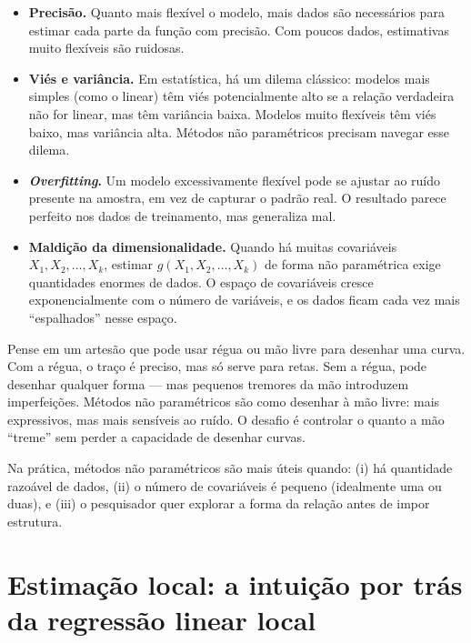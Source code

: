 \begin{itemize}
  \item \textbf{Precisão.} Quanto mais flexível o modelo, mais dados são necessários
  para estimar cada parte da função com precisão. Com poucos dados, estimativas muito
  flexíveis são ruidosas.

  \item \textbf{Viés e variância.} Em estatística, há um dilema clássico: modelos
  mais simples (como o linear) têm viés potencialmente alto se a relação verdadeira
  não for linear, mas têm variância baixa. Modelos muito flexíveis têm viés baixo,
  mas variância alta. Métodos não paramétricos precisam navegar esse dilema.

  \item \textbf{\emph{Overfitting}.} Um modelo excessivamente flexível pode se ajustar
  ao ruído presente na amostra, em vez de capturar o padrão real. O resultado parece
  perfeito nos dados de treinamento, mas generaliza mal.

  \item \textbf{Maldição da dimensionalidade.} Quando há muitas covariáveis $X_1, X_2,
  \ldots, X_k$, estimar $g(X_1, X_2, \ldots, X_k)$ de forma não paramétrica exige
  quantidades enormes de dados. O espaço de covariáveis cresce exponencialmente com
  o número de variáveis, e os dados ficam cada vez mais ``espalhados'' nesse espaço.
\end{itemize}

\begin{destacebox}
Pense em um artesão que pode usar régua ou mão livre para desenhar uma curva. Com a
régua, o traço é preciso, mas só serve para retas. Sem a régua, pode desenhar qualquer
forma — mas pequenos tremores da mão introduzem imperfeições. Métodos não paramétricos
são como desenhar à mão livre: mais expressivos, mas mais sensíveis ao ruído. O
desafio é controlar o quanto a mão ``treme'' sem perder a capacidade de desenhar
curvas.
\end{destacebox}

Na prática, métodos não paramétricos são mais úteis quando: (i) há quantidade
razoável de dados, (ii) o número de covariáveis é pequeno (idealmente uma ou duas),
e (iii) o pesquisador quer explorar a forma da relação antes de impor estrutura.

\chapter{Estimação local: a intuição por trás da regressão linear local}

